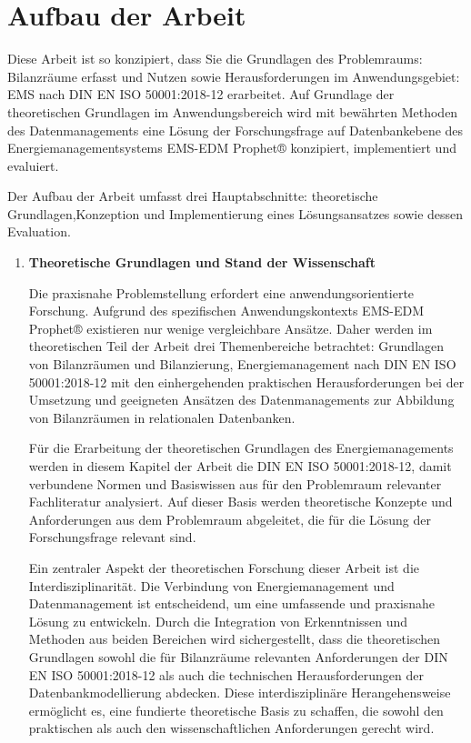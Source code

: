 \section{Aufbau der Arbeit}
Diese Arbeit ist so konzipiert, dass Sie die Grundlagen des Problemraums: Bilanzräume erfasst und Nutzen sowie Herausforderungen im Anwendungsgebiet: 
EMS nach DIN EN ISO 50001:2018-12 erarbeitet. Auf Grundlage der theoretischen Grundlagen im Anwendungsbereich wird mit bewährten Methoden des Datenmanagements 
eine Lösung der Forschungsfrage auf Datenbankebene des Energiemanagementsystems EMS-EDM Prophet® konzipiert, implementiert und evaluiert.

Der Aufbau der Arbeit umfasst drei Hauptabschnitte: theoretische Grundlagen,Konzeption und Implementierung eines Lösungsansatzes sowie dessen 
Evaluation.
\begin{enumerate}
    \item \textbf{Theoretische Grundlagen und Stand der Wissenschaft}
    
    Die praxisnahe Problemstellung erfordert eine anwendungsorientierte Forschung. 
    Aufgrund des spezifischen Anwendungskontexts EMS-EDM Prophet® existieren nur wenige vergleichbare Ansätze.
    Daher werden im theoretischen Teil der Arbeit drei Themenbereiche betrachtet: Grundlagen von Bilanzräumen und Bilanzierung, Energiemanagement nach
    DIN EN ISO 50001:2018-12 mit den einhergehenden praktischen Herausforderungen bei der Umsetzung und geeigneten Ansätzen des Datenmanagements zur Abbildung
    von Bilanzräumen in relationalen Datenbanken.
    
    Für die Erarbeitung der theoretischen Grundlagen des Energiemanagements werden in diesem Kapitel der Arbeit die DIN EN ISO 50001:2018-12, damit verbundene Normen und
    Basiswissen aus für den Problemraum relevanter Fachliteratur analysiert. Auf dieser Basis werden theoretische Konzepte und Anforderungen aus dem
    Problemraum abgeleitet, die für die Lösung der Forschungsfrage relevant sind.
    
    Ein zentraler Aspekt der theoretischen Forschung dieser Arbeit ist die Interdisziplinarität. Die Verbindung von Energiemanagement und Datenmanagement
    ist entscheidend, um eine umfassende und praxisnahe Lösung zu entwickeln. Durch die Integration von Erkenntnissen und Methoden aus beiden Bereichen
    wird sichergestellt, dass die theoretischen Grundlagen sowohl die für Bilanzräume relevanten Anforderungen der DIN EN ISO 50001:2018-12 als auch die technischen
    Herausforderungen der Datenbankmodellierung abdecken. Diese interdisziplinäre Herangehensweise ermöglicht es, eine fundierte theoretische Basis zu
    schaffen, die sowohl den praktischen als auch den wissenschaftlichen Anforderungen gerecht wird.
    

\end{enumerate}

